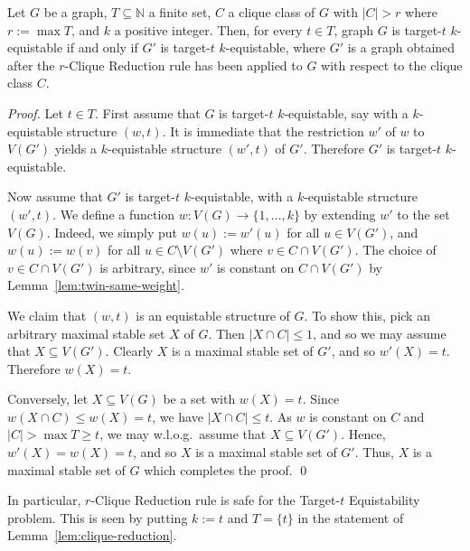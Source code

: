 \documentclass{llncs}
\begin{document}
\begin{lemma}\label{lem:clique-reduction}
Let $G$ be a graph, $T \subseteq \mathbb N$ a finite set, $C$ a clique class of $G$ with $|C|>r$ where $r := \max T$, and $k$ a positive integer.
Then, for every $t\in T$, graph $G$ is target-$t$ $k$-equistable if and only if $G'$ is target-$t$ $k$-equistable, where $G'$ is a graph obtained after the $r$-Clique Reduction rule has been applied to $G$ with respect to the clique class $C$.
\end{lemma}

\begin{proof}
Let $t\in T$. First assume that $G$ is target-$t$ $k$-equistable, say with a $k$-equistable structure $(w,t)$.
It is immediate that the restriction $w'$ of $w$ to $V(G')$ yields a $k$-equistable structure $(w',t)$ of $G'$.
Therefore $G'$ is target-$t$ $k$-equistable.

Now assume that $G'$ is target-$t$ $k$-equistable, with a $k$-equistable structure $(w',t)$.
We define a function $w : V(G) \to \{1,\ldots,k\}$ by extending $w'$ to the set $V(G)$.
Indeed, we simply put $w(u):=w'(u)$ for all $u \in V(G')$, and $w(u) := w(v)$ for all $u \in C \setminus V(G')$ where $v \in C \cap V(G')$.
The choice of $v \in C \cap V(G')$ is arbitrary, since $w'$ is constant on $C \cap V(G')$ by Lemma~\ref{lem:twin-same-weight}.

We claim that $(w,t)$ is an equistable structure of $G$.
To show this, pick an arbitrary maximal stable set $X$ of $G$.
Then $|X \cap C| \le 1$, and so we may assume that $X \subseteq V(G')$.
Clearly $X$ is a maximal stable set of $G'$, and so $w'(X) = t$.
Therefore $w(X)=t$.

Conversely, let $X \subseteq V(G)$ be a set with $w(X)=t$.
Since $w(X \cap C) \le w(X) = t$, we have $|X \cap C| \le t$.
As $w$ is constant on $C$ and $|C| > \max T \ge t$, we may w.l.o.g.~assume that $X \subseteq V(G')$.
Hence, $w'(X)=w(X)=t$, and so $X$ is a maximal stable set of $G'$.
Thus, $X$ is a maximal stable set of $G$ which completes the proof.
\qed \end{proof}

In particular, $r$-Clique Reduction rule is safe for the {\sc Target-$t$ Equistability} problem.
This is seen by putting $k:=t$ and $T=\{t\}$ in the statement of Lemma~\ref{lem:clique-reduction}.
\end{document}
